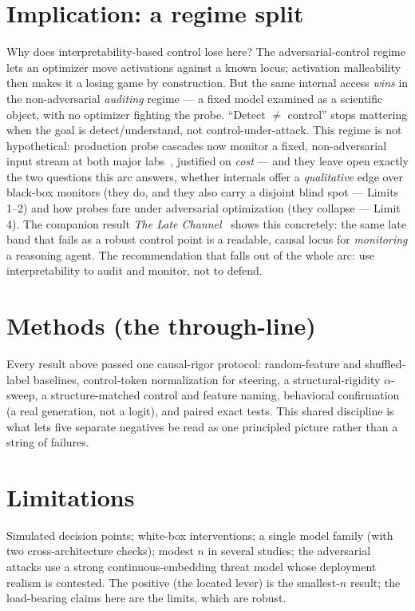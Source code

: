 \documentclass[11pt]{article}
\begin{document}
\section{Implication: a regime split}
Why does interpretability-based control lose here? The adversarial-control regime lets an optimizer move
activations against a known locus; activation malleability then makes it a losing game by construction. But the
same internal access \emph{wins} in the non-adversarial \emph{auditing} regime --- a fixed model examined as a
scientific object, with no optimizer fighting the probe. ``Detect $\neq$ control'' stops mattering when the goal
is detect/understand, not control-under-attack. This regime is not hypothetical: production probe cascades now
monitor a fixed, non-adversarial input stream at both major labs~\cite{kramar2026}, justified on \emph{cost} ---
and they leave open exactly the two questions this arc answers, whether internals offer a \emph{qualitative} edge
over black-box monitors (they do, and they also carry a disjoint blind spot --- Limits 1--2) and how probes fare
under adversarial optimization (they collapse --- Limit 4). The companion result \emph{The Late Channel}~\cite{latechannel}
shows this concretely: the same late band that fails as a robust control point is a readable, causal locus for
\emph{monitoring} a reasoning agent. The recommendation that falls out of the whole arc: use interpretability to
audit and monitor, not to defend.

\section{Methods (the through-line)}
Every result above passed one causal-rigor protocol: random-feature and shuffled-label baselines, control-token
normalization for steering, a structural-rigidity $\alpha$-sweep, a structure-matched control and feature naming,
behavioral confirmation (a real generation, not a logit), and paired exact tests. This shared discipline is what
lets five separate negatives be read as one principled picture rather than a string of failures.

\section{Limitations}
Simulated decision points; white-box interventions; a single model family (with two cross-architecture checks);
modest $n$ in several studies; the adversarial attacks use a strong continuous-embedding threat model whose
deployment realism is contested. The positive (the located lever) is the smallest-$n$ result; the load-bearing
claims here are the limits, which are robust.
\end{document}
